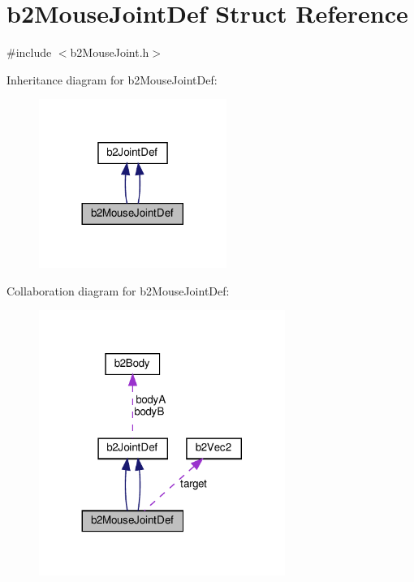 \hypertarget{structb2MouseJointDef}{}\section{b2\+Mouse\+Joint\+Def Struct Reference}
\label{structb2MouseJointDef}


{\ttfamily \#include $<$b2\+Mouse\+Joint.\+h$>$}



Inheritance diagram for b2\+Mouse\+Joint\+Def\+:
\nopagebreak
\begin{figure}[H]
\begin{center}
\leavevmode
\includegraphics[width=173pt]{structb2MouseJointDef__inherit__graph}
\end{center}
\end{figure}


Collaboration diagram for b2\+Mouse\+Joint\+Def\+:
\nopagebreak
\begin{figure}[H]
\begin{center}
\leavevmode
\includegraphics[width=227pt]{structb2MouseJointDef__coll__graph}
\end{center}
\end{figure}
